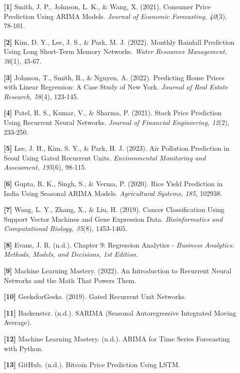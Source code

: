 \documentclass[conference]{IEEEtran}
\begin{document}
\begin{enumerate}
    \item [\textbf{[1]}] Smith, J. P., Johnson, L. K., \& Wang, X. (2021). Consumer Price Prediction Using ARIMA Models. \textit{Journal of Economic Forecasting, 40}(3), 78-101.
    
    \item [\textbf{[2]}] Kim, D. Y., Lee, J. S., \& Park, M. J. (2022). Monthly Rainfall Prediction Using Long Short-Term Memory Networks. \textit{Water Resources Management, 36}(1), 45-67.
    
    \item [\textbf{[3]}] Johnson, T., Smith, R., \& Nguyen, A. (2022). Predicting House Prices with Linear Regression: A Case Study of New York. \textit{Journal of Real Estate Research, 58}(4), 123-145.
    
    \item [\textbf{[4]}] Patel, R. S., Kumar, V., \& Sharma, P. (2021). Stock Price Prediction Using Recurrent Neural Networks. \textit{Journal of Financial Engineering, 12}(2), 233-250.
    
    \item [\textbf{[5]}] Lee, J. H., Kim, S. Y., \& Park, H. J. (2023). Air Pollution Prediction in Seoul Using Gated Recurrent Units. \textit{Environmental Monitoring and Assessment, 195}(6), 98-115.
    
    \item [\textbf{[6]}] Gupta, R. K., Singh, S., \& Verma, P. (2020). Rice Yield Prediction in India Using Seasonal ARIMA Models. \textit{Agricultural Systems, 185}, 102938.
    
    \item [\textbf{[7]}] Wang, L. Y., Zhang, X., \& Liu, H. (2019). Cancer Classification Using Support Vector Machines and Gene Expression Data. \textit{Bioinformatics and Computational Biology, 35}(8), 1453-1465.
    
    \item [\textbf{[8]}] Evans, J. R. (n.d.). Chapter 9: Regression Analytics - \textit{Business Analytics: Methods, Models, and Decisions, 1st Edition}.
    
    \item [\textbf{[9]}] Machine Learning Mastery. (2022). An Introduction to Recurrent Neural Networks and the Math That Powers Them.
    
    \item [\textbf{[10]}] GeeksforGeeks. (2019). Gated Recurrent Unit Networks.
    
    \item [\textbf{[11]}] Backenster. (n.d.). SARIMA (Seasonal Autoregressive Integrated Moving Average).
    
    \item [\textbf{[12]}] Machine Learning Mastery. (n.d.). ARIMA for Time Series Forecasting with Python.
    
    \item [\textbf{[13]}] GitHub. (n.d.). Bitcoin Price Prediction Using LSTM.
\end{enumerate}
\end{document}
